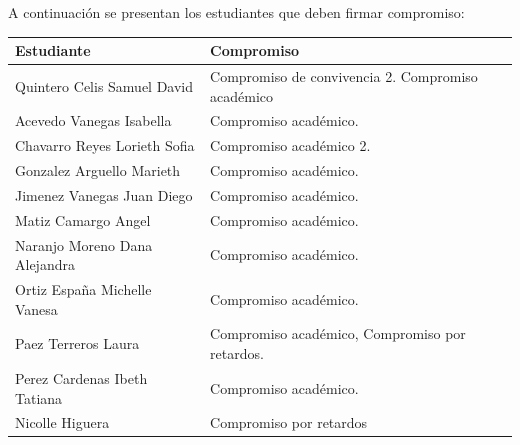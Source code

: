 \documentclass[spanish,11pt,a4paper]{article}
\begin{document}
	\begin{flushleft}
		A continuación se presentan los estudiantes que deben firmar compromiso:\\
	\end{flushleft}
	\vspace{0.5cm}
	\begin{longtable}{|p{6cm}|p{5cm}|}
		\hline
		\textbf{Estudiante} & \textbf{Compromiso} \\
		\hline\hline
		
		
		Quintero Celis Samuel David & Compromiso de convivencia 2.
		Compromiso académico  \\
		\hline
		
		Acevedo Vanegas Isabella & Compromiso académico.  \\
		\hline
		
		Chavarro Reyes Lorieth Sofia & Compromiso académico 2.  \\
		\hline
		
		Gonzalez Arguello Marieth & Compromiso académico.\\
		\hline
		
		Jimenez Vanegas Juan Diego & Compromiso académico.\\
		\hline
		
		Matiz Camargo Angel & Compromiso académico.\\
		\hline
		
		Naranjo Moreno Dana Alejandra & Compromiso académico. \\
		\hline
		
		Ortiz España Michelle Vanesa & Compromiso académico.\\
		\hline
		
		Paez Terreros Laura & Compromiso académico, Compromiso por retardos.\\
		\hline
		
		Perez Cardenas Ibeth Tatiana & Compromiso académico.\\
		\hline
		
		Nicolle Higuera & Compromiso por retardos \\
		\hline
		
		
		
		
		
	\end{longtable}
	
	
\end{document}
